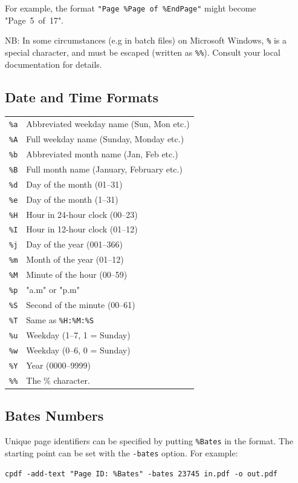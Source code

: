 \documentclass{book}
\begin{document}
  \vspace{2mm}
  \noindent For example, the format \texttt{"Page~\%Page~of~\%EndPage"} might become "Page~5~of~17".

  NB: In some circumstances (e.g in batch files) on Microsoft Windows, \verb!%! is a special character, and must be escaped (written as \verb$%%$). Consult your local documentation for details.

  \subsection{Date and Time Formats}
  \begin{tabular}{ll}
    \texttt{\%a} & Abbreviated weekday name (Sun, Mon etc.)\\
    \texttt{\%A} & Full weekday name (Sunday, Monday etc.)\\
    \texttt{\%b} & Abbreviated month name (Jan, Feb etc.)\\
    \texttt{\%B} & Full month name (January, February etc.)\\
    \texttt{\%d} & Day of the month (01--31) \\
    \texttt{\%e} & Day of the month (1--31) \\
    \texttt{\%H} & Hour in 24-hour clock (00--23)\\
    \texttt{\%I} & Hour in 12-hour clock (01--12)\\
    \texttt{\%j} & Day of the year (001--366)\\
    \texttt{\%m} & Month of the year (01--12)\\
    \texttt{\%M} & Minute of the hour (00--59)\\
    \texttt{\%p} & "a.m" or "p.m"\\
    \texttt{\%S} & Second of the minute (00--61)\\
    \texttt{\%T} & Same as \texttt{\%H:\%M:\%S}\\
    \texttt{\%u} & Weekday (1--7, 1 = Sunday)\\
    \texttt{\%w} & Weekday (0--6, 0 = Sunday)\\
    \texttt{\%Y} & Year (0000--9999)\\
    \texttt{\%\%} & The \% character.
  \end{tabular}

  \subsection{Bates Numbers}
  Unique page identifiers can be specified by putting \verb!%Bates! in the format.
The starting point can be set with the \texttt{-bates} option. For example:
  \begin{framed}
    \noindent\small\verb!cpdf -add-text "Page ID: %Bates" -bates 23745 in.pdf -o out.pdf!
  \end{framed}
\end{document}
